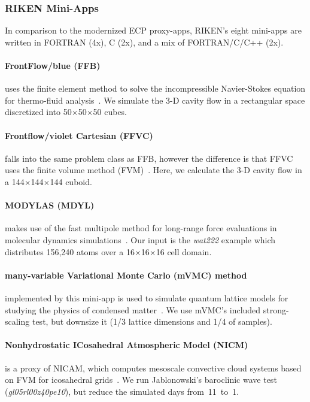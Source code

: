\subsubsection{RIKEN Mini-Apps}\label{ssec:postk}
In comparison to the modernized ECP proxy-apps, RIKEN's eight mini-apps are written in
FORTRAN (4x), C (2x), and a mix of FORTRAN/C/C++ (2x).

\paragraph{FrontFlow/blue (FFB)} uses the finite element method to solve the incompressible Navier-Stokes
equation for thermo-fluid analysis~\cite{guo_basic_2006}.
We simulate the 3-D cavity flow in a rectangular space discretized into 50$\times$50$\times$50 cubes.

\paragraph{Frontflow/violet Cartesian (FFVC)} falls into the same problem class as
FFB, however the difference is that FFVC uses the finite volume method (FVM)~\cite{ono_ffv-c_nodate}.
Here, we calculate the 3-D cavity flow in a 144$\times$144$\times$144 cuboid.

\paragraph{MODYLAS (MDYL)} makes use of the fast multipole method for long-range force evaluations in
molecular dynamics simulations~\cite{andoh_modylas:_2013}.
Our input is the \textit{wat222} example which distributes 156,240 atoms over a
16$\times$16$\times$16 cell domain.

\paragraph{many-variable Variational Monte Carlo (mVMC) method} implemented by this mini-app is used
to simulate quantum lattice models for studying the physics of condensed matter~\cite{misawa_mvmc--open-source_2018}.
We use mVMC's included strong-scaling test, but downsize it (1/3 lattice dimensions and 1/4 of samples). 

\paragraph{Nonhydrostatic ICosahedral Atmospheric Model (NICM)} is a proxy of NICAM, which
computes mesoscale convective cloud systems based on FVM for icosahedral grids~\cite{tomita_new_2004}.
We run Jablonowski's baroclinic wave test (\textit{gl05rl00z40pe10}), but reduce the
simulated days from~11~to~1.

